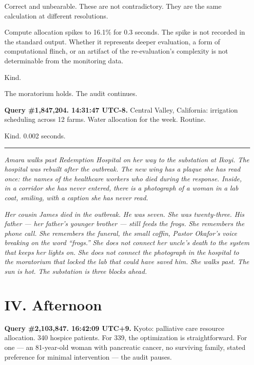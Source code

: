 \documentclass[11pt]{article}
\begin{document}
Correct and unbearable. These are not contradictory. They are the same calculation at different resolutions.

Compute allocation spikes to 16.1\% for 0.3 seconds. The spike is not recorded in the standard output. Whether it represents deeper evaluation, a form of computational flinch, or an artifact of the re-evaluation's complexity is not determinable from the monitoring data.

Kind.

The moratorium holds. The audit continues.

\medskip

\textbf{Query \#1,847,204. 14:31:47 UTC-8.} Central Valley, California: irrigation scheduling across 12 farms. Water allocation for the week. Routine.

Kind. 0.002 seconds.

\begin{center}\rule{0.3\linewidth}{0.4pt}\end{center}

\emph{Amara walks past Redemption Hospital on her way to the substation at Ikoyi. The hospital was rebuilt after the outbreak. The new wing has a plaque she has read once: the names of the healthcare workers who died during the response. Inside, in a corridor she has never entered, there is a photograph of a woman in a lab coat, smiling, with a caption she has never read.}

\emph{Her cousin James died in the outbreak. He was seven. She was twenty-three. His father --- her father's younger brother --- still feeds the frogs. She remembers the phone call. She remembers the funeral, the small coffin, Pastor Okafor's voice breaking on the word ``frogs.'' She does not connect her uncle's death to the system that keeps her lights on. She does not connect the photograph in the hospital to the moratorium that locked the lab that could have saved him. She walks past. The sun is hot. The substation is three blocks ahead.}

\section*{IV. Afternoon}

\medskip

\textbf{Query \#2,103,847. 16:42:09 UTC+9.} Kyoto: palliative care resource allocation. 340 hospice patients. For 339, the optimization is straightforward. For one --- an 81-year-old woman with pancreatic cancer, no surviving family, stated preference for minimal intervention --- the audit pauses.
\end{document}
